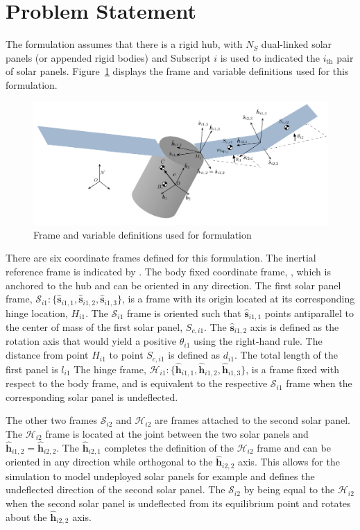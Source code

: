 \documentclass[paper]{aiaaNew}
\begin{document}
	\section{Problem Statement}
	
	The formulation assumes that there is a rigid hub, with $N_S$ dual-linked solar panels (or appended rigid bodies) and Subscript $i$ is used to indicated the $i_\text{th}$ pair of solar panels. Figure~\ref{fig:Flex_Slosh_Figure} displays the frame and variable definitions used for this formulation.

	\begin{figure}
		\centering
		\includegraphics[]{Figures/Flex_Slosh_Figure}
		\caption{Frame and variable definitions used for formulation}
		\label{fig:Flex_Slosh_Figure}
	\end{figure} 
	
	There are six coordinate frames defined for this formulation. The inertial reference frame is indicated by . The body fixed coordinate frame, , which is anchored to the hub and can be oriented in any direction. The first solar panel frame, $\mathcal{S}_{i1}:\{\hat{\bm s}_{i1,1},\hat{\bm s}_{i1,2},\hat{\bm s}_{i1,3}\}$, is a frame with its origin located at its corresponding hinge location, $H_{i1}$. The $\mathcal{S}_{i1}$ frame is oriented such that $\hat{\bm{s}}_{i1,1}$ points antiparallel to the center of mass of the first solar panel, $S_{c,i1}$. The $\hat{\bm{s}}_{i1,2}$ axis is defined as the rotation axis that would yield a positive $\theta_{i1}$ using the right-hand rule. The distance from point $H_{i1}$ to point $S_{c,i1}$ is defined as $d_{i1}$. The total length of the first panel is $l_{i1}$ The hinge frame, $\mathcal{H}_{i1}:\{\hat{\bm h}_{i1,1}, \hat{\bm h}_{i1,2}, \hat{\bm h}_{i1,3} \}$, is a frame fixed with respect to the body frame, and is equivalent to the respective $\mathcal{S}_{i1}$ frame when the corresponding solar panel is undeflected.

	The other two frames $\mathcal{S}_{i2}$ and $\mathcal{H}_{i2}$ are frames attached to the second solar panel. The $\mathcal{H}_{i2}$ frame is located at the joint between the two solar panels and $\hat{\bm h}_{i1,2} = \hat{\bm h}_{i2,2}$. The $\hat{\bm h}_{i2,1}$ completes the definition of the $\mathcal{H}_{i2}$ frame and can be oriented in any direction while orthogonal to the $\hat{\bm h}_{i2,2}$ axis. This allows for the simulation to model undeployed solar panels for example and defines the undeflected direction of the second solar panel. The $\mathcal{S}_{i2}$ by being equal to the $\mathcal{H}_{i2}$ when the second solar panel is undeflected from its equilibrium point and rotates about the $\hat{\bm h}_{i2,2}$ axis.
	
\end{document}

